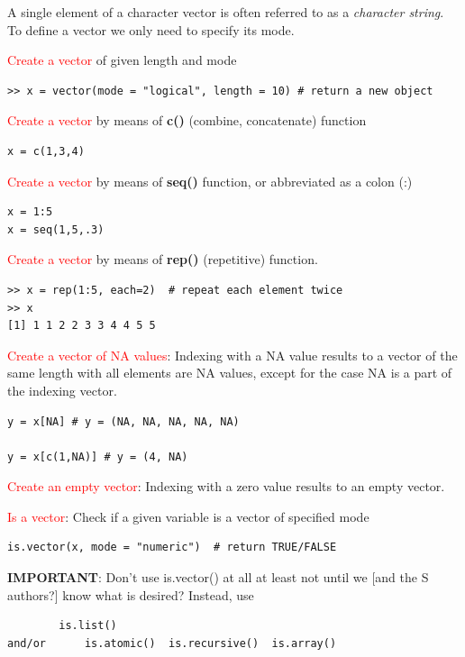A single element of a character vector is often referred to as a
{\it character string}.  To define a vector we only need to specify
its mode.



\textcolor{red}{Create a vector} of given length and mode
\begin{lstlisting}
>> x = vector(mode = "logical", length = 10) # return a new object
\end{lstlisting}

\textcolor{red}{Create a vector} by means of {\bf c()}  (combine,
concatenate) function
\begin{lstlisting}
x = c(1,3,4)
\end{lstlisting}

\textcolor{red}{Create a vector} by means of {\bf seq()} function, or
abbreviated as a colon (:)
\begin{lstlisting}
x = 1:5
x = seq(1,5,.3)
\end{lstlisting}

\textcolor{red}{Create a vector} by means of {\bf rep()} (repetitive)
function.
\begin{lstlisting}
>> x = rep(1:5, each=2)  # repeat each element twice
>> x
[1] 1 1 2 2 3 3 4 4 5 5
\end{lstlisting}

\textcolor{red}{Create a vector of NA values}: Indexing with a NA
value results to a vector of the same length with all elements are NA
values, except for the case NA is a part of the indexing vector.
\begin{lstlisting}
y = x[NA] # y = (NA, NA, NA, NA, NA)

y = x[c(1,NA)] # y = (4, NA)
\end{lstlisting}

\textcolor{red}{Create an empty vector}: Indexing with a zero value
results to an empty vector.

\textcolor{red}{Is a vector}: Check if a given variable is a vector of
specified mode
\begin{lstlisting}
is.vector(x, mode = "numeric")  # return TRUE/FALSE
\end{lstlisting}


{\bf IMPORTANT}: Don't use is.vector() at all at least not until we
[and the S authors?]  know what is desired?  Instead, use
\begin{verbatim}
		is.list()
and/or		is.atomic()  is.recursive()  is.array()
\end{verbatim}

